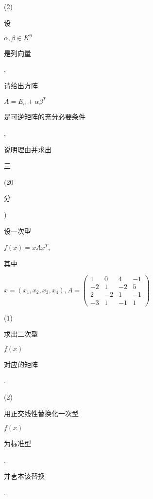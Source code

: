 \documentclass[10pt]{article}
\begin{document}
(2) \begin{CJK}{UTF8}{mj}设\end{CJK} $\alpha, \beta \in K^{n}$ \begin{CJK}{UTF8}{mj}是列向量\end{CJK}, \begin{CJK}{UTF8}{mj}请给出方阵\end{CJK} $A=E_{n}+\alpha \beta^{T}$ \begin{CJK}{UTF8}{mj}是可逆矩阵的充分必要条件\end{CJK}, \begin{CJK}{UTF8}{mj}说明理由并求出\end{CJK} \begin{CJK}{UTF8}{mj}三\end{CJK} (20 \begin{CJK}{UTF8}{mj}分\end{CJK}) \begin{CJK}{UTF8}{mj}设一次型\end{CJK} $f(x)=x A x^{T}$, \begin{CJK}{UTF8}{mj}其中\end{CJK} $x=\left(x_{1}, x_{2}, x_{3}, x_{4}\right), A=\left(\begin{array}{cccc}1 & 0 & 4 & -1 \\ -2 & 1 & -2 & 5 \\ 2 & -2 & 1 & -1 \\ -3 & 1 & -1 & 1\end{array}\right)$

(1)\begin{CJK}{UTF8}{mj}求出二次型\end{CJK} $f(x)$ \begin{CJK}{UTF8}{mj}对应的矩阵\end{CJK}.

(2) \begin{CJK}{UTF8}{mj}用正交线性替换化一次型\end{CJK} $f(x)$ \begin{CJK}{UTF8}{mj}为标准型\end{CJK}, \begin{CJK}{UTF8}{mj}并㐊本该替换\end{CJK}.
\end{document}
